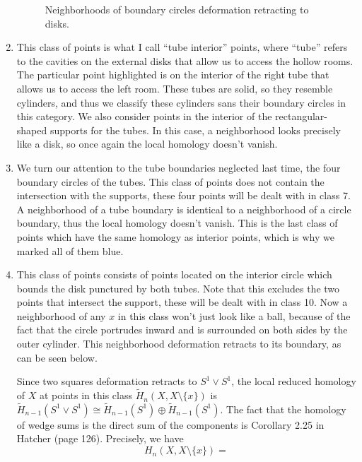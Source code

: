 \begin{solution}
\begin{enumerate}
        \begin{figure}[H]
        \centering
        \caption{Neighborhoods of boundary circles deformation retracting to disks.}
        \label{h2}
        \end{figure}
    \item This class of points is what I call ``tube interior'' points, where ``tube'' refers to the cavities on the external disks that allow us to access the hollow rooms. The particular point highlighted is on the interior of the right tube that allows us to access the left room. These tubes are solid, so they resemble cylinders, and thus we classify these cylinders sans their boundary circles in this category. We also consider points in the interior of the rectangular-shaped supports for the tubes. In this case, a neighborhood looks precisely like a disk, so once again the local homology doesn't vanish.
    \item We turn our attention to the tube boundaries neglected last time, the four boundary circles of the tubes. This class of points does not contain the intersection with the supports, these four points will be dealt with in class 7. A neighborhood of a tube boundary is identical to a neighborhood of a circle boundary, thus the local homology doesn't vanish. This is the last class of points which have the same homology as interior points, which is why we marked all of them blue.
    \item This class of points consists of points located on the interior circle which bounds the disk punctured by both tubes. Note that this excludes the two points that intersect the support, these will be dealt with in class 10. Now a neighborhood of any $x$ in this class won't just look like a ball, because of the fact that the circle portrudes inward and is surrounded on both sides by the outer cylinder. This neighborhood deformation retracts to its boundary, as can be seen below.
        \begin{figure}[H]
        \centering
        \label{h5}
        \end{figure}
        Since two squares deformation retracts to $S^1 \vee S^1 $, the local reduced homology of $X$ at points in this class $\widetilde H_n (X, X\setminus \{x\} )$ is $\widetilde H_{n-1}(S^1 \vee S^1 )\cong \widetilde H_{n-1}(S^1 )\oplus \widetilde H_{n-1}(S^1 )$. The fact that the homology of wedge sums is the direct sum of the components is Corollary 2.25 in Hatcher (page 126). Precisely, we have \[
            H_n (X,X \setminus \{x\} )= 
\]
\end{enumerate}
\end{solution}
